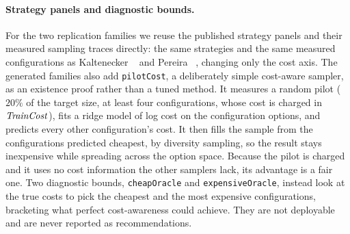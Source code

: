 \paragraph*{Strategy panels and diagnostic bounds.}
For the two replication families we reuse the published strategy panels and their
measured sampling traces directly: the same strategies and the same measured
configurations as Kaltenecker \etal\ \cite{kaltenecker2019} and Pereira \etal\
\cite{pereira2020}, changing only the cost axis. The generated families also add \texttt{pilotCost}, a deliberately simple
cost-aware sampler, as an existence proof rather than a tuned method. It measures
a random pilot ($20\%$ of the target size, at least four configurations, whose cost
is charged in $\mathit{TrainCost}$), fits a ridge model of log cost on the configuration
options, and predicts every other configuration's cost. It then fills the sample
from the configurations predicted cheapest, by diversity sampling, so the result
stays inexpensive while spreading across the option space. Because the pilot is
charged and it uses no cost information the other samplers lack, its advantage is
a fair one. Two diagnostic bounds, \texttt{cheapOracle} and \texttt{expensiveOracle},
instead look at the true costs to pick the cheapest and the most expensive
configurations, bracketing what perfect cost-awareness could achieve. They are not
deployable and are never reported as recommendations.
